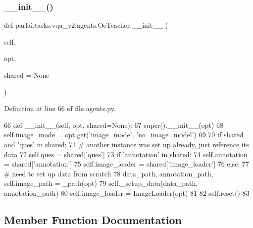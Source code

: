 \subsubsection{\texorpdfstring{\+\_\+\+\_\+init\+\_\+\+\_\+()}{\_\_init\_\_()}}
{\footnotesize\ttfamily def parlai.\+tasks.\+vqa\+\_\+v2.\+agents.\+Oe\+Teacher.\+\_\+\+\_\+init\+\_\+\+\_\+ (\begin{DoxyParamCaption}\item[{}]{self,  }\item[{}]{opt,  }\item[{}]{shared = {\ttfamily None} }\end{DoxyParamCaption})}



Definition at line 66 of file agents.\+py.


\begin{DoxyCode}
66     \textcolor{keyword}{def }\_\_init\_\_(self, opt, shared=None):
67         super().\_\_init\_\_(opt)
68         self.image\_mode = opt.get(\textcolor{stringliteral}{'image\_mode'}, \textcolor{stringliteral}{'no\_image\_model'})
69 
70         \textcolor{keywordflow}{if} shared \textcolor{keywordflow}{and} \textcolor{stringliteral}{'ques'} \textcolor{keywordflow}{in} shared:
71             \textcolor{comment}{# another instance was set up already, just reference its data}
72             self.ques = shared[\textcolor{stringliteral}{'ques'}]
73             \textcolor{keywordflow}{if} \textcolor{stringliteral}{'annotation'} \textcolor{keywordflow}{in} shared:
74                 self.annotation = shared[\textcolor{stringliteral}{'annotation'}]
75             self.image\_loader = shared[\textcolor{stringliteral}{'image\_loader'}]
76         \textcolor{keywordflow}{else}:
77             \textcolor{comment}{# need to set up data from scratch}
78             data\_path, annotation\_path, self.image\_path = \_path(opt)
79             self.\_setup\_data(data\_path, annotation\_path)
80             self.image\_loader = ImageLoader(opt)
81 
82         self.reset()
83 
\end{DoxyCode}


\subsection{Member Function Documentation}
\mbox{\label{classparlai_1_1tasks_1_1vqa__v2_1_1agents_1_1OeTeacher_a75d45765b191394b0defbbe3b8bb09e0}} 
